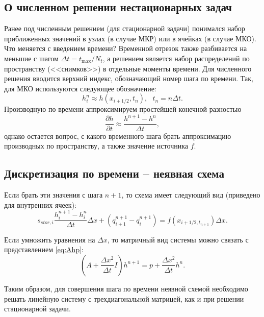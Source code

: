 \documentclass[a4paper, 11pt]{article}
\begin{document}
\subsection{О численном решении нестационарных задач}
Ранее под численным решением (для стационарной задачи) понимался набор приближенных значений в узлах (в случае МКР) или в ячейках (в случае МКО). Что меняется с 
введением времени? Временной отрезок также разбивается на меньшие с шагом $\Delta t = t_{\max}/N_t$, 
а решением является набор распределений по пространству (<<снимков>>) в отдельные моменты времени. Для численного решения вводится верхний индекс, обозначающий номер
шага по времени. Так, для МКО используются следующее обозначение:
\begin{equation}
	h_i^n \approx h(x_{i+1/2}, t_n),~~~t_n = n\Delta t.
\end{equation}
Производную по времени аппроксимируем простейшей конечной разностью
\begin{equation}
	\frac{\partial h}{\partial t} \approx \frac{h^{n+1} - h^n}{\Delta t},
\end{equation}
однако остается вопрос, с какого временного шага брать аппроксимацию производных по пространству, а также
значение источника $f$.


\subsection{Дискретизация по времени -- неявная схема}
Если брать эти значения с шага $n+1$, то схема имеет следующий вид (приведено для внутренних ячеек):
\begin{equation}
	s_{stor,i}\frac{h_i^{n+1} - h_i^n}{\Delta t}\Delta x + (q_{i+1}^{n+1} - q_i^{n+1}) = f(x_{i+1/2, t_{n+1}})\Delta x. 
\end{equation}

Если умножить уравнения на $\Delta x$, то матричный вид системы можно связать с представлением \eqref{eq:Ahp}:
\begin{equation}
	\left(A + \frac{\Delta x^2}{\Delta t}I\right)h^{n+1} = p + \frac{\Delta x^2}{\Delta t}h^n.
\end{equation}

Таким образом, для совершения шага по времени неявной схемой необходимо решать линейную систему с трехдиагональной матрицей, как и при решении стационарной задачи.
\end{document}
